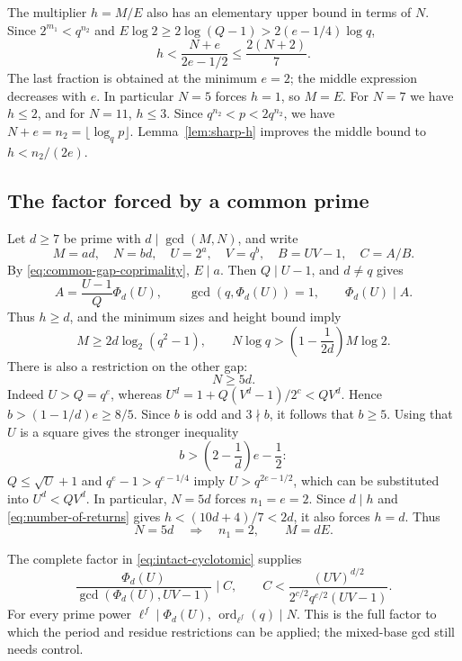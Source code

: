 \documentclass[11pt]{article}
\begin{document}
The multiplier $h=M/E$ also has an elementary upper bound in terms of
$N$. Since $2^{m_1}<q^{n_2}$ and
$E\log2\ge2\log(Q-1)>2(e-1/4)\log q$,
\begin{equation}\label{eq:number-of-returns}
\boxed{h<\frac{N+e}{2e-1/2}\le\frac{2(N+2)}7.}
\end{equation}
The last fraction is obtained at the minimum $e=2$; the middle
expression decreases with $e$. In particular $N=5$ forces $h=1$,
so $M=E$. For $N=7$ we have $h\le2$, and for $N=11$, $h\le3$.
Since $q^{n_2}<p<2q^{n_2}$, we have
$N+e=n_2=\lfloor\log_q p\rfloor$.
Lemma~\ref{lem:sharp-h} improves the middle bound to $h<n_2/(2e)$.

\subsection{The factor forced by a common prime}
Let $d\ge7$ be prime with $d\mid\gcd(M,N)$, and write
\[
M=ad,\quad N=bd,\quad U=2^a,\quad V=q^b,\quad
B=UV-1,\quad C=A/B.
\]
By \eqref{eq:common-gap-coprimality}, $E\mid a$.
Then $Q\mid U-1$, and $d\ne q$ gives
\begin{equation}\label{eq:intact-cyclotomic}
A=\frac{U-1}{Q}\Phi_d(U),\qquad
\gcd(q,\Phi_d(U))=1,\qquad \Phi_d(U)\mid A.
\end{equation}
Thus $h\ge d$, and the minimum sizes and height bound imply
\[
M\ge2d\log_2(q^2-1),\qquad
N\log q>\left(1-\frac1{2d}\right)M\log2.
\]
There is also a restriction on the other gap:
\begin{equation}\label{eq:five-d}
\boxed{N\ge5d.}
\end{equation}
Indeed $U>Q=q^e$, whereas
$U^d=1+Q(V^d-1)/2^c<QV^d$.
Hence $b>(1-1/d)e\ge8/5$.
Since $b$ is odd and $3\nmid b$, it follows that $b\ge5$.
Using that $U$ is a square gives the stronger inequality
\[
b>\left(2-\frac1d\right)e-\frac12:
\]
$Q\le\sqrt U+1$ and $q^e-1>q^{e-1/4}$ imply
$U>q^{2e-1/2}$, which can be substituted into $U^d<QV^d$.
In particular, $N=5d$ forces $n_1=e=2$.
Since $d\mid h$ and \eqref{eq:number-of-returns} gives
$h<(10d+4)/7<2d$, it also forces $h=d$. Thus
\[
N=5d\quad\Longrightarrow\quad n_1=2,\qquad M=dE.
\]

The complete factor in \eqref{eq:intact-cyclotomic} supplies
\[
\frac{\Phi_d(U)}{\gcd(\Phi_d(U),UV-1)}\mid C,
\qquad
C<\frac{(UV)^{d/2}}{2^{c/2}q^{e/2}(UV-1)}.
\]
For every prime power $\ell^f\mid\Phi_d(U)$,
$\operatorname{ord}_{\ell^f}(q)\mid N$.
This is the full factor to which the period and residue restrictions
can be applied; the mixed-base gcd still needs control.
\end{document}
